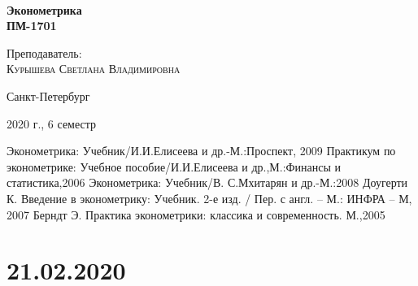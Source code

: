 \documentclass[aps,%
12pt,%
final,%
oneside,
onecolumn,%
musixtex, %
superscriptaddress,%
centertags]{article} %
\begin{document}
\begin{titlepage} 
\begin{center}
 
\textbf{}\\[10.0cm]
\textbf{\LARGE Эконометрика}\\[0.5cm]
\textbf{\Large ПМ-1701} \\[0.1cm]

\begin{center} \large
{Преподаватель:} \\[0.5cm]
\textsc {Курышева Светлана Владимировна }\\
\end{center}
\vfill 

{\large {Санкт-Петербург}} \par
{\large {2020 г., 6 семестр}}
\end{center} 
\end{titlepage}

\begin{thebibliography}{3}
Эконометрика: Учебник/И.И.Елисеева и др.-М.:Проспект, 2009
Практикум по эконометрике: Учебное пособие/И.И.Елисеева и др.,М.:Финансы и статистика,2006 
Эконометрика: Учебник/В. С.Мхитарян и др.-М.:2008
Доугерти К. Введение в эконометрику: Учебник. 2-е изд. / Пер. с англ. – М.: ИНФРА – М, 2007
Берндт Э. Практика эконометрики: классика и современность. М.,2005
\end{thebibliography}
\tableofcontents
\newpage

\section{21.02.2020}
\end{document}
